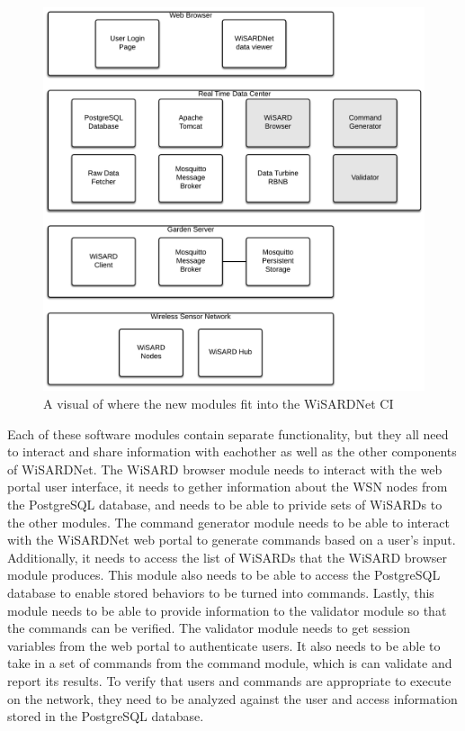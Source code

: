 \begin{figure}[H]
	\centering
	\includegraphics[width=\textwidth]{figures/wisardnet_ci_additions.png}
	\caption{A visual of where the new modules fit into the WiSARDNet CI}
	\label{fig:wisardnet_ci_updated}
\end{figure}

Each of these software modules contain separate functionality, but they all need to interact and share information with eachother as well as the other components of WiSARDNet. The WiSARD browser module needs to interact with the web portal user interface, it needs to gether information about the WSN nodes from the PostgreSQL database, and needs to be able to privide sets of WiSARDs to the other modules. The command generator module needs to be able to interact with the WiSARDNet web portal to generate commands based on a user's input. Additionally, it needs to access the list of WiSARDs that the WiSARD browser module produces. This module also needs to be able to access the PostgreSQL database to enable stored behaviors to be turned into commands. Lastly, this module needs to be able to provide information to the validator module so that the commands can be verified. The validator module needs to get session variables from the web portal to authenticate users. It also needs to be able to take in a set of commands from the command module, which is can validate and report its results.  To verify that users and commands are appropriate to execute on the network, they need to be analyzed against the user and access information stored in the PostgreSQL database.\\


